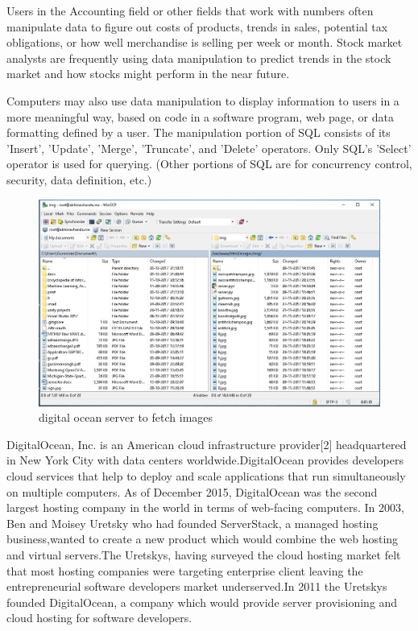 Users in the Accounting field or other fields that work with numbers often manipulate data to figure out costs of products, trends in sales, potential tax obligations, or how well merchandise is selling per week or month. Stock market analysts are frequently using data manipulation to predict trends in the stock market and how stocks might perform in the near future.

Computers may also use data manipulation to display information to users in a more meaningful way, based on code in a software program, web page, or data formatting defined by a user.
The manipulation portion of SQL consists of its 'Insert', 'Update', 'Merge', 'Truncate', and 'Delete' operators. Only SQL's 'Select' operator is used for querying. (Other portions of SQL are for concurrency control, security, data definition, etc.)

\begin{figure}[ht]
\centering
\includegraphics[scale=0.50]{images/server1.png}
\caption{digital ocean server to fetch images}
\end{figure}

DigitalOcean, Inc. is an American cloud infrastructure provider[2] headquartered in New York City with data centers worldwide.DigitalOcean provides developers cloud services that help to deploy and scale applications that run simultaneously on multiple computers. As of December 2015, DigitalOcean was the second largest hosting company in the world in terms of web-facing computers.
In 2003, Ben and Moisey Uretsky who had founded ServerStack, a managed hosting business,wanted to create a new product which would combine the web hosting and virtual servers.The Uretskys, having surveyed the cloud hosting market felt that most hosting companies were targeting enterprise client leaving the entrepreneurial software developers market underserved.In 2011 the Uretskys founded DigitalOcean, a company which would provide server provisioning and cloud hosting for software developers.

